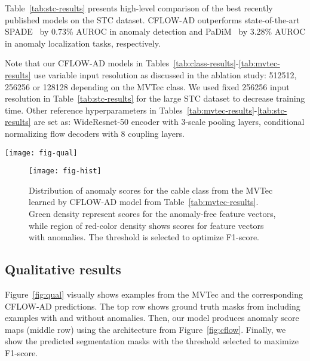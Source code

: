 \documentclass[10pt,twocolumn,letterpaper]{article}
\begin{document}
Table~\ref{tab:stc-results} presents high-level comparison of the best recently published models on the STC dataset. CFLOW-AD outperforms state-of-the-art SPADE~\cite{cohen2021subimage} by 0.73\% AUROC in anomaly detection and PaDiM~\cite{defard2020padim} by 3.28\% AUROC in anomaly localization tasks, respectively.

Note that our CFLOW-AD models in Tables~\ref{tab:class-results}-\ref{tab:mvtec-results} use variable input resolution as discussed in the ablation study: 512512, 256256 or 128128 depending on the MVTec class. We used fixed 256256 input resolution in Table~\ref{tab:stc-results} for the large STC dataset to decrease training time. Other reference hyperparameters in Tables~\ref{tab:mvtec-results}-\ref{tab:stc-results} are set as: WideResnet-50 encoder with 3-scale pooling layers, conditional normalizing flow decoders with 8 coupling layers.

\begin{figure*}[ht]
	\centering
	\texttt{[image: fig-qual]}
	\caption{Examples of the input images with ground truth anomaly masks (top row) for various classes of the MVTec. Our CFLOW-AD model from Table~\ref{tab:mvtec-results} estimates anomaly score maps (middle row) and generates segmentation masks (bottom row) for a threshold selected to maximize F1-score. The predicted segmentation mask should match the corresponding ground truth as close as possible.}
	\label{fig:qual}
\end{figure*}

\begin{figure}[h]
	\centering
	\texttt{[image: fig-hist]}
	\caption{Distribution of anomaly scores for the cable class from the MVTec learned by CFLOW-AD model from Table~\ref{tab:mvtec-results}. Green density represent scores for the anomaly-free feature vectors, while region of red-color density shows scores for feature vectors with anomalies. The threshold  is selected to optimize F1-score.}
	\label{fig:hist}
\end{figure}

\subsection{Qualitative results}
\label{subsec:qual_eval}
Figure~\ref{fig:qual} visually shows examples from the MVTec and the corresponding CFLOW-AD predictions. The top row shows ground truth masks from  including examples with and without anomalies. Then, our model produces anomaly score maps (middle row) using the architecture from Figure~\ref{fig:cflow}. Finally, we show the predicted segmentation masks with the threshold selected to maximize F1-score.
\end{document}
